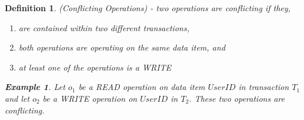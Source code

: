 \documentclass[conference]{IEEEtran}
\newtheorem{definition}{Definition}
\newtheorem{example}{Example}[definition]
\begin{document}


%  
%  

\begin{definition}
\label{conflict_ops}
 (Conflicting Operations) - two operations are conflicting if they,

 \begin{enumerate}
   \item are contained within two different transactions,
   \item both operations are operating on the same data item, and
   \item at least one of the operations is a WRITE
 \end{enumerate}

 \begin{example}
 \label{ex_conflict_ops}
  Let $o_{1}$ be a READ operation on data item $User ID$ in transaction $T_{1}$ and let $o_{2}$ be a WRITE operation on $User ID$ in $T_{2}$. These two operations are conflicting.
 \end{example}
\end{definition}
\end{document}
